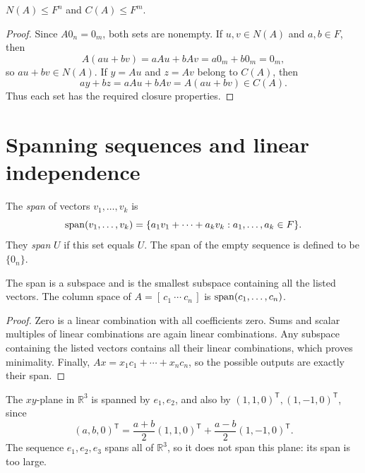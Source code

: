 \begin{lemma}
$N(A)\leq F^n$ and $C(A)\leq F^m$.
\end{lemma}
\begin{proof}
Since $A0_n=0_m$, both sets are nonempty.
If $u,v\in N(A)$ and $a,b\in F$, then
\[
 A(au+bv)=aAu+bAv=a0_m+b0_m=0_m,
\]
so $au+bv\in N(A)$. If $y=Au$ and $z=Av$ belong to $C(A)$, then
\[
 ay+bz=aAu+bAv=A(au+bv)\in C(A).
\]
Thus each set has the required closure properties.
\end{proof}

\section{Spanning sequences and linear independence}

\begin{definition}
The \emph{span} of vectors $v_1,\ldots,v_k$ is
\[
 \operatorname{span}(v_1,\ldots,v_k)
 =\{a_1v_1+\cdots+a_kv_k:a_1,\ldots,a_k\in F\}.
\]
They \emph{span} $U$ if this set equals $U$. The span of the empty
sequence is defined to be $\{0_n\}$.
\end{definition}

\begin{proposition}
The span is a subspace and is the smallest subspace containing all the
listed vectors. The column space of $A=[\,c_1\ \cdots\ c_n\,]$ is
$\operatorname{span}(c_1,\ldots,c_n)$.
\end{proposition}
\begin{proof}
Zero is a linear combination with all coefficients zero. Sums and scalar
multiples of linear combinations are again linear combinations.
Any subspace containing the listed vectors contains all their linear
combinations, which proves minimality. Finally,
$Ax=x_1c_1+\cdots+x_nc_n$, so the possible outputs are exactly their span.
\end{proof}

\begin{example}
The $xy$-plane in $\mathbb R^3$ is spanned by $e_1,e_2$, and also by
$(1,1,0)^{\mathsf T},(1,-1,0)^{\mathsf T}$, since
\[
 (a,b,0)^{\mathsf T}
 =\frac{a+b}{2}(1,1,0)^{\mathsf T}
  +\frac{a-b}{2}(1,-1,0)^{\mathsf T}.
\]
The sequence $e_1,e_2,e_3$ spans all of $\mathbb R^3$, so it does not
span this plane: its span is too large.
\end{example}

